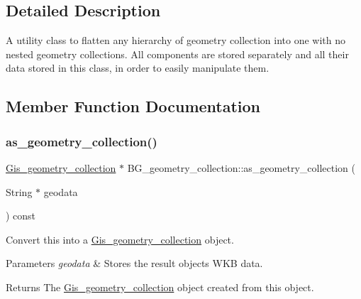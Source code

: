 \subsection{Detailed Description}
A utility class to flatten any hierarchy of geometry collection into one with no nested geometry collections. All components are stored separately and all their data stored in this class, in order to easily manipulate them. 

\subsection{Member Function Documentation}
\mbox{\label{classBG__geometry__collection_aef572d61cb0bd24a4680c7450ac9723a}} 
\subsubsection{\texorpdfstring{as\+\_\+geometry\+\_\+collection()}{as\_geometry\_collection()}}
{\footnotesize\ttfamily \mbox{\hyperlink{classGis__geometry__collection}{Gis\+\_\+geometry\+\_\+collection}} $\ast$ B\+G\+\_\+geometry\+\_\+collection\+::as\+\_\+geometry\+\_\+collection (\begin{DoxyParamCaption}\item[{String $\ast$}]{geodata }\end{DoxyParamCaption}) const}

Convert this into a \mbox{\hyperlink{classGis__geometry__collection}{Gis\+\_\+geometry\+\_\+collection}} object. 
\begin{DoxyParams}{Parameters}
{\em geodata} & Stores the result object\textquotesingle{}s W\+KB data. \\
\hline
\end{DoxyParams}
\begin{DoxyReturn}{Returns}
The \mbox{\hyperlink{classGis__geometry__collection}{Gis\+\_\+geometry\+\_\+collection}} object created from this object. 
\end{DoxyReturn}
\mbox{\label{classBG__geometry__collection_ad927b9c81246e31a33db8451e8460427}} 
